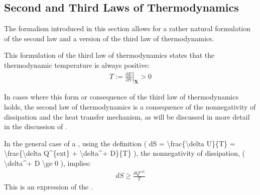 \documentclass[letterpaper,10pt,english]{jupyterBook}
\begin{document}
\subsection{Second and Third Laws of Thermodynamics}
\label{\detokenize{ch/principles-gibbs-phase-rule:second-and-third-laws-of-thermodynamics}}
\sphinxAtStartPar
The formalism introduced in this section allows for a rather natural formulation of the second law and a version of the third law of thermodynamics.

\sphinxAtStartPar
This formulation of the third law of thermodynamics states that the thermodynamic temperature is always positive:
\begin{equation*}
\begin{split}
T := \left.\frac{\partial E}{\partial S}\right|_{\mathbf{X}} > 0
\end{split}
\end{equation*}
\sphinxAtStartPar
{} 

\sphinxAtStartPar
In cases where this form or consequence of the third law of thermodynamics holds, the second law of thermodynamics is a consequence of the non\sphinxhyphen{}negativity of dissipation and the heat transfer mechanism, as will be discussed in more detail in the discussion of {\hyperref[\detokenize{ch/principles-second:physics-hs-thermodynamics-principles-second-composite}]{}}.

\sphinxAtStartPar
In the general case of a , using the definition ( dS = \textbackslash{}frac\{\textbackslash{}delta U\}\{T\} = \textbackslash{}frac\{\textbackslash{}delta Q\textasciicircum{}\{ext\} + \textbackslash{}delta\textasciicircum{}+ D\}\{T\} ), the non\sphinxhyphen{}negativity of dissipation, ( \textbackslash{}delta\textasciicircum{}+ D \textbackslash{}ge 0 ), implies:
\begin{equation*}
\begin{split}
dS \ge \frac{\delta Q^{ext}}{T}
\end{split}
\end{equation*}
\sphinxAtStartPar
This is an expression of the {\hyperref[\detokenize{ch/principles-second:physics-hs-thermodynamics-foundation-principles-second}]{}}.

\sphinxAtStartPar
{}    
\end{document}

